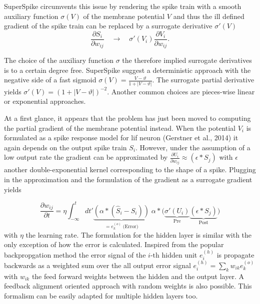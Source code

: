 SuperSpike circumvents this issue by rendering the spike train with a smooth auxiliary function $\sigma(V)$ of the membrane potential $V$ and thus the ill defined gradient of the spike train can be replaced by a surrogate derivative $\sigma'(V)$
\begin{equation}
\frac{\partial S_i}{\partial w_{ij}} \quad \rightarrow \quad \sigma'(V_i)\frac{\partial V_i}{\partial w_{ij}}.
\end{equation}

The choice of the auxiliary function $\sigma$ the therefore implied surrogate derivatives is to a certain degree free. SuperSpike suggest a deterministic approach with the negative side of a fast sigmoid $\sigma(V) = \frac{V - \vartheta}{1 + |V - \vartheta|}$. The surrogate partial derivative yields $\sigma'(V) = \left(1 + |V - \vartheta|\right)^{-2}$. Another common choices are pieces-wise linear or exponential approaches.

At a first glance, it appears that the problem has just been moved to computing the partial gradient of the membrane potential instead. When the potential $V_i$ is formulated as a spike response model for \gls{lif} neuron (Gerstner et al., 2014) it again depends on the output spike train $S_i$. However, under the assumption of a low output rate the gradient can be approximated by $\frac{\partial U_i}{\partial w_{ij}} \approx (\epsilon \ast S_j)$ with $\epsilon$ another double-exponential kernel corresponding to the shape of a spike. Plugging in the approximation and the formulation of the gradient as a surrogate gradient yields

\begin{equation}
\label{superspikeweightupdateeq}
\frac{\partial w_{ij}}{\partial t} = \eta \int_{-\infty}^{t} dt'
\underbrace{\left(\alpha \ast (\hat{S}_i - S_i)\right)}_{= e^{(o)}_k \; \text{(Error)}} 
\; \alpha \ast 
\Big(\underbrace{\sigma'(U_i)}_{\text{Pre}} 
\underbrace{\left(\epsilon \ast S_j\right)}_{\text{Post}}\Big)
\end{equation}
with $\eta$ the learning rate. The formulation for the hidden layer is similar with the only exception of how the error is calculated. Inspired from the popular backpropgation method the error signal of the $i \text{-th}$ hidden unit $e^{(h)}_i$ is propagate backwards as a weighted sum over the all output error signal $e^{(h)}_i = \sum_{k} w_{ik} e^{(o)}_k$ with $w_{ik}$ the feed forward weights between the hidden and the output layer. A feedback alignment oriented approach with random weights is also possible. This formalism can be easily adapted for multiple hidden layers too.


